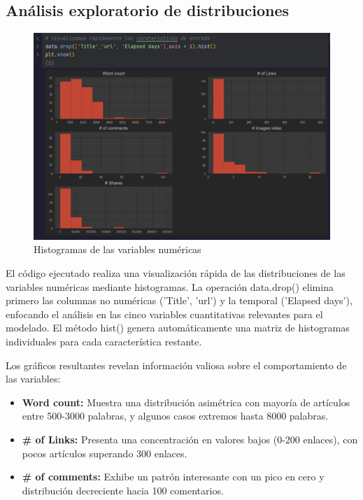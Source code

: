 \documentclass[12pt, a4paper]{article}
\begin{document}
\subsection{Análisis exploratorio de distribuciones}

\begin{figure}[H]
    \centering
    \includegraphics[width=1.0\textwidth]{Actividad-10/Imagen2.png}
    \caption{Histogramas de las variables numéricas}
\end{figure}

El código ejecutado realiza una visualización rápida de las distribuciones de las variables numéricas mediante histogramas. La operación data.drop() elimina primero las columnas no numéricas ('Title', 'url') y la temporal ('Elapsed days'), enfocando el análisis en las cinco variables cuantitativas relevantes para el modelado. El método hist() genera automáticamente una matriz de histogramas individuales para cada característica restante.

Los gráficos resultantes revelan información valiosa sobre el comportamiento de las variables:

\begin{itemize}
    \item\textbf{Word count:} Muestra una distribución asimétrica con mayoría de artículos entre 500-3000 palabras, y algunos casos extremos hasta 8000 palabras.
    \item\textbf{\# of Links:} Presenta una concentración en valores bajos (0-200 enlaces), con pocos artículos superando 300 enlaces.
    \item\textbf{\# of comments:} Exhibe un patrón interesante con un pico en cero y distribución decreciente hacia 100 comentarios.
\end{itemize}
\end{document}
